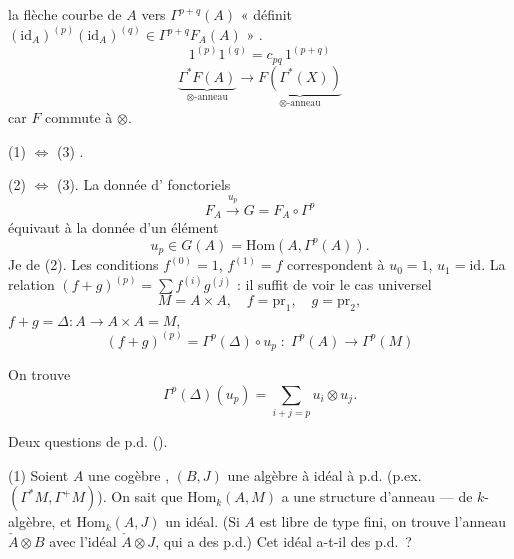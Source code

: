 \documentclass[11pt,a4paper]{article}
\begin{document}
la flèche courbe de $A$ vers $\Gamma^{p+q}(A)$ « définit $(\mathrm{id}_A)^{(p)}(\mathrm{id}_A)^{(q)} \in \Gamma^{p+q}F_A(A)$ »
.
\[
1^{(p)}1^{(q)} = c_{pq}\,1^{(p+q)}
\]
\[
\underbrace{\Gamma^*F(A)}_{\otimes\text{-anneau}} \longrightarrow \underbrace{F(\Gamma^*(X))}_{\otimes\text{-anneau}}
\]
car $F$ commute à $\otimes$.

(1) $\Longleftrightarrow$ (3) .

(2) $\Longleftrightarrow$ (3). La donnée d' fonctoriels
\[
F_A \xrightarrow{u_p} G = F_A\circ\Gamma^p
\]
équivaut à la donnée d'un élément
\[
u_p \in G(A) = \mathrm{Hom}(A,\Gamma^p(A)).
\]
Je  \ill{}  \ill{} de (2). Les conditions $f^{(0)} = 1$, $f^{(1)} = f$ correspondent à $u_0 = 1$, $u_1 = \mathrm{id}$. La relation $(f+g)^{(p)} = \sum f^{(i)}g^{(j)}$ : il suffit de voir le cas universel
\[
M = A\times A, \quad f = \mathrm{pr}_1, \quad g = \mathrm{pr}_2,
\]
$f+g = \Delta : A \to A\times A = M$,
\[
(f+g)^{(p)} = \Gamma^p(\Delta)\circ u_p \;:\; \Gamma^p(A) \longrightarrow \Gamma^p(M)
\]



On trouve
\[
\Gamma^p(\Delta)(u_p) = \sum_{i+j=p} u_i\otimes u_j .
\]

Deux questions de p.d. ().

(1) Soient $A$ une cogèbre  , $(B,J)$ une algèbre à idéal à p.d. (p.ex. $(\Gamma^*M,\Gamma^+M)$). On sait que $\mathrm{Hom}_k(A,M)$ a une structure d'anneau ---  de $k$-algèbre, et $\mathrm{Hom}_k(A,J)$  un idéal. (Si $A$ est libre de type fini, on trouve l'anneau $\check A\otimes B$ avec l'idéal $\check A\otimes J$, qui a des p.d.) Cet idéal a-t-il des p.d.~?
\end{document}
